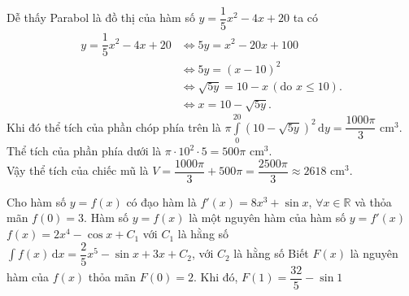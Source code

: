 \begin{ex}
{	Dễ thấy Parabol là đồ thị của hàm số $y = \dfrac{1}{5}x^2 - 4x + 20$ ta có
	\begin{align*}
		y = \dfrac{1}{5}x^2 - 4x + 20 &\Leftrightarrow 5y = x^2 - 20x + 100\\
		&\Leftrightarrow 5y = \left(x-10 \right)^2 \\
		&\Leftrightarrow \sqrt{5y} = 10 - x \, (\text{do } x \leq 10).\\
		&\Leftrightarrow x = 10 - \sqrt{5y}.
	\end{align*}
	Khi đó thể tích của phần chóp phía trên là $\pi\displaystyle\int\limits_0^{20} \left(10 - \sqrt{5y} \right)^2\mathrm{\,d}y = \dfrac{1000\pi}{3}$ cm$^3$.\\
	Thể tích của phần phía dưới là $\pi \cdot 10^2 \cdot 5 = 500\pi$ cm$^3$.\\
	Vậy thể tích của chiếc mũ là $V = \dfrac{1000\pi}{3} + 500\pi = \dfrac{2500\pi}{3} \approx 2618$ cm$^3$.
	}
\end{ex}

\begin{ex}%
	Cho hàm số $y = f(x)$ có đạo hàm là $f'(x) = 8x^3 + \sin{x}$, $\forall x \in \mathbb{R}$ và thỏa mãn $f(0) = 3$.
	\choiceTF
	{\True Hàm số $y = f(x)$ là một nguyên hàm của hàm số $y = f'(x)$}
	{$f(x) = 2x^4 - \cos{x} + C_1$ với $C_1$ là hằng số}
	{$\displaystyle\int\limits f\left(x \right)\mathrm{\,d}x = \dfrac{2}{5}x^5 - \sin{x} + 3x + C_2$, với $C_2$ là hằng số}
	{\True Biết $F(x)$ là nguyên hàm của $f(x)$ thỏa mãn $F(0) = 2$. Khi đó, $F(1) = \dfrac{32}{5} - \sin{1}$}
\end{ex}

